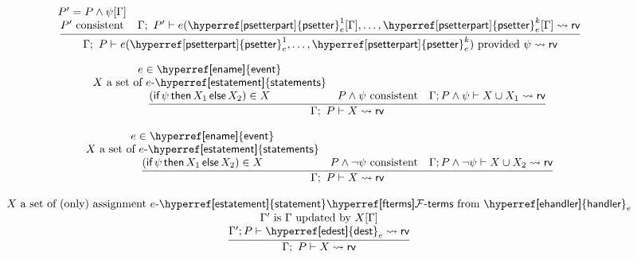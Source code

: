 \documentclass[12pt]{article}
\newcommand{\stackone}[2]{\deduce{#1}{#2}}
\newcommand{\stacktwo}[3]{\deduce{#1}{\deduce{#2}{#3}}}
\newcommand{\minil}{\textsf{MiniL4}}
\newcommand{\term}[1]{\EM{\textsf{\hyperref[#1]{#1}}}\xspace}
\newcommand{\termz}[2]{\EM{\textsf{\hyperref[#1]{#2}}}\xspace}
\newcommand{\lsm}{\term{LSM}}
\newcommand{\lsms}{\termz{LSM}{LSMs}}
\newcommand{\ename}{\termz{ename}{event}}
\newcommand{\edest}[1]{\textsf{\hyperref[edest]{dest}}_{#1}}
\newcommand{\ehandlerof}[1]{\EM{\textsf{\hyperref[ehandler]{handler}}_{#1}}\xspace}
\newcommand{\psetterpart}[2]{{\sf \hyperref[psetterpart]{psetter}}_{#1}^{#2}}
\newcommand{\cond}[3]{\textsf{if}\, #1 \, \textsf{then} \, #2 \, \textsf{else}\, #3}
\newcommand{\estatement}[1]{\EM{#1\text{-}\textsf{\hyperref[estatement]{statement}}}}
\newcommand{\estatements}[1]{\EM{#1\text{-}\textsf{\hyperref[estatement]{statements}}}}
\begin{document}
\[
\infer{
	\SV ;\ P \vdash \yields{ \deadrule{e}{\psetterpart{e}{1},\ldots,\psetterpart{e}{k}}{\psi}}{\rv} 
}
{
	\stackone{P' \text{ consistent}}
		       {P' = P \wedge \psi[\SV]}
&	\SV;\ P' \vdash \yields{e(\psetterpart{e}{1}[\SV],\ldots,\psetterpart{e}{k}[\SV]}{\rv} 
}
\]



\[
\infer{
	\SV ;\ P \vdash \yields{ X }{\rv}
}
{
	\stacktwo{(\cond{\psi}{X_1}{X_2}) \in X }{
		X \text{ a set of } \estatements{e}}{
		e \in \ename}
&	\full{\SV}{P \wedge \psi} \text{ consistent}
& 	\SV; P \wedge \psi \vdash \yields{X \cup X_1}{\rv} 
}
\]

\[
\infer{
	\SV ;\ P \vdash \yields{ X }{\rv}
}{
	\stacktwo{
		(\cond{\psi}{X_1}{X_2}) \in X }{
		X \text{ a set of } \estatements{e}}{
		e \in \ename
	}	
&	\full{\SV}{P \wedge \neg \psi} \text{ consistent}	
& 	\SV; P \wedge \neg\psi \vdash \yields{X \cup X_2}{\rv} 
}
\]

\[
\infer{
	\SV ;\ P \vdash \yields{X}{\rv}
}{	\stacktwo
	 	{\SV' ; P \vdash \yields{\edest{e}}{\rv} }
		{\SV' \text{ is } \SV \text{ updated by } X[\Gamma]}
		{X \text{ a set of (only) assignment } \estatement{e} \fterms \text{ from } \ehandlerof{e}} 
}
\]





%



\end{document}

